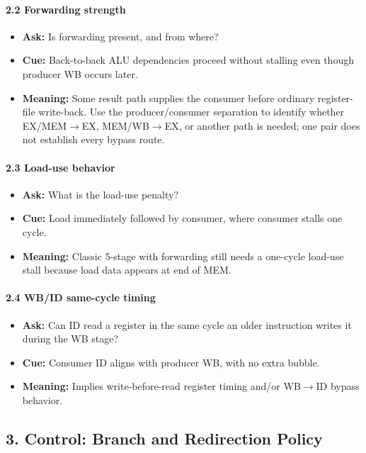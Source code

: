 \paragraph{2.2 Forwarding strength}\label{par:auto-032}
\begin{itemize}
    \item \textbf{Ask:} Is forwarding present, and from where?
    \item \textbf{Cue:} Back-to-back ALU dependencies proceed without stalling even though producer WB occurs later.
    \item \textbf{Meaning:} Some result path supplies the consumer before ordinary register-file write-back.
    Use the producer/consumer separation to identify whether EX/MEM$\rightarrow$EX, MEM/WB$\rightarrow$EX, or another path is needed; one pair does not establish every bypass route.
\end{itemize}

\paragraph{2.3 Load-use behavior}\label{par:auto-033}
\begin{itemize}
    \item \textbf{Ask:} What is the load-use penalty?
    \item \textbf{Cue:} Load immediately followed by consumer, where consumer stalls one cycle.
    \item \textbf{Meaning:} Classic 5-stage with forwarding still needs a one-cycle load-use stall because load data appears at end of MEM\@.
\end{itemize}

\paragraph{2.4 WB/ID same-cycle timing}\label{par:auto-034}
\begin{itemize}
    \item \textbf{Ask:} Can ID read a register in the same cycle an older instruction writes it during the WB stage?
    \item \textbf{Cue:} Consumer ID aligns with producer WB, with no extra bubble.
    \item \textbf{Meaning:} Implies write-before-read register timing and/or WB$\rightarrow$ID bypass behavior.
\end{itemize}

\subsection*{3. Control: Branch and Redirection Policy}\label{subsec:auto-017}

